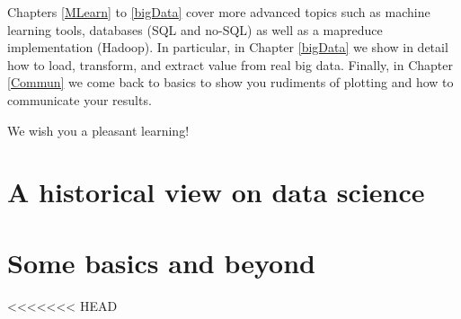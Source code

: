 \documentclass[10pt]{PhDthesisPSnPDF}%
\begin{document}
Chapters \ref{MLearn} to \ref{bigData} cover more advanced topics such as machine learning tools, databases (SQL and no-SQL) as well as a mapreduce implementation (Hadoop). In particular, in Chapter \ref{bigData} we show in detail how to load, transform, and extract value from real big data. Finally, in Chapter \ref{Commun} we come back to basics to show you rudiments of plotting and how to communicate your results. 

We wish you a pleasant learning!

\newpage
\thispagestyle{empty}
\mbox{}
\cleardoublepage

\setcounter{tocdepth}{2}




\setcounter{secnumdepth}{3} %
\setcounter{tocdepth}{2}    %
\tableofcontents            %


	


\newpage
\chapter{A historical view on data science}\label{DS}

\cleardoublepage



\newpage
\chapter{Some basics and beyond}
\label{basics}

<<<<<<< HEAD
\cleardoublepage
\end{document}
